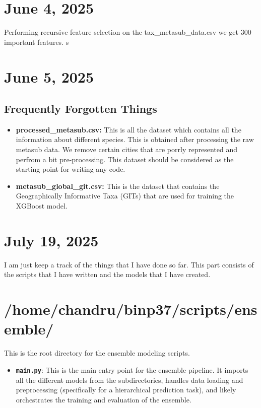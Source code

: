 \documentclass{article}
\begin{document}

\section{June 4, 2025}
Performing recursive feature selection on the tax\_metasub\_data.csv we get 300 important features.
s
\section{June 5, 2025}
\subsection*{Frequently Forgotten Things}
\begin{itemize}
    \item \textbf{processed\_metasub.csv:} This is all the dataset which contains all the information about different species. This is obtained after processing the 
    raw metasub data. We remove certain cities that are porrly represented and perfrom a bit pre-processing. This dataset should be considered as the starting point 
    for writing any code.
    \item \textbf{metasub\_global\_git.csv:} This is the dataset that contains the Geographically Informative Taxa (GITs) that are used for training the XGBoost model.
\end{itemize}


\section{July 19, 2025}
I am just keep a track of the things that I have done so far. This part consists of the scripts that I have written and the models that I have created.
 
\section*{/home/chandru/binp37/scripts/ensemble/}
This is the root directory for the ensemble modeling scripts.
\begin{itemize}
    \item \textbf{\texttt{main.py}}: This is the main entry point for the ensemble pipeline. It imports all the different models from the subdirectories, handles data loading and preprocessing (specifically for a hierarchical prediction task), and likely orchestrates the training and evaluation of the ensemble.
\end{itemize}
\end{document}
